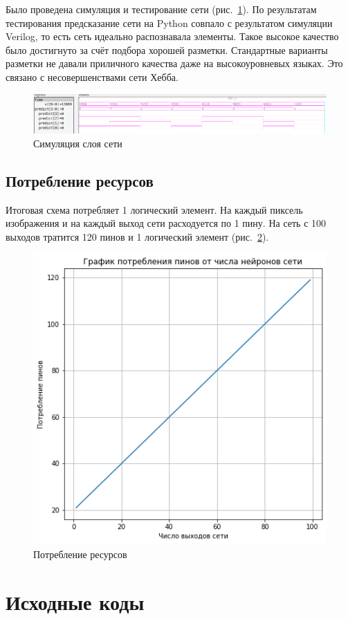\documentclass[a4paper,14pt]{article}
\begin{document}
    Было проведена симуляция и тестирование сети (рис.~\ref{fig:sim_test}).
    По результатам тестирования предсказание сети на Python совпало с результатом симуляции Verilog,
    то есть сеть идеально распознавала элементы.
    Такое высокое качество было достигнуто за счёт подбора хорошей разметки.
    Стандартные варианты разметки не давали приличного качества даже на высокоуровневых языках.
    Это связано с несовершенствами сети Хебба.

    \begin{figure}[H]
        \centering
        \includegraphics[width=\linewidth]{images/sim_test}
        \caption{Симуляция слоя сети}
        \label{fig:sim_test}
    \end{figure}

    \subsection{Потребление ресурсов}
    Итоговая схема потребляет 1 логический элемент.
    На каждый пиксель изображения и на каждый выход сети расходуется по 1 пину.
    На сеть с 100 выходов тратится 120 пинов и 1 логический элемент (рис.~\ref{fig:plot}).
    \begin{figure}[H]
        \centering
        \includegraphics[width=0.5\linewidth]{images/plot}
        \caption{Потребление ресурсов}
        \label{fig:plot}
    \end{figure}


    \section{Исходные коды}
\end{document}
